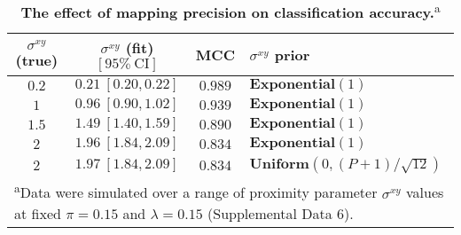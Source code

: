 \begin{table}[]
\caption{\label{tab:proximity} \textbf{The effect of mapping precision on classification accuracy.}\textsuperscript{a}}
\begin{tabular}{cccl}
    \toprule
    $\sigma^{xy}$ (true) & $\sigma^{xy}$ (fit) \: $[95\% \: \text{CI}]$  & MCC & $\sigma^{xy}$ prior \\
    \midrule
    $0.2$ & $0.21 \: [0.20, 0.22]$ & $0.989$ & $\mathbf{Exponential}(1)$ \\
    $1$ & $0.96 \: [0.90, 1.02]$ & $0.939$ & $\mathbf{Exponential}(1)$ \\
    $1.5$ & $1.49 \: [1.40, 1.59]$ & $0.890$ & $\mathbf{Exponential}(1)$ \\
    $2$ & $1.96 \: [1.84, 2.09]$ & $0.834$ & $\mathbf{Exponential}(1)$ \\
    $2$ & $1.97 \: [1.84, 2.09]$ & $0.834$ & $\mathbf{Uniform}(0, (P+1) / \sqrt{12})$ \\
    \bottomrule
    \multicolumn{4}{l}{\footnotesize{\parbox{0.75\textwidth}{\rule{0pt}{3ex}\textsuperscript{a}Data were simulated over a range of proximity parameter $\sigma^{xy}$ values at fixed $\pi=0.15$ and $\lambda=0.15$
    (Supplemental Data 6).}}} \\
    \bottomrule
\end{tabular}
\end{table}